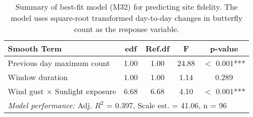 \begin{table}[ht]
\centering
\caption{Summary of best-fit model (M32) for predicting site fidelity. The model uses square-root transformed day-to-day changes in butterfly count as the response variable.}
\label{tab:m32_summary}
\begin{tabular}{lcccc}
\toprule
\textbf{Smooth Term} & \textbf{edf} & \textbf{Ref.df} & \textbf{F} & \textbf{p-value} \\
\midrule
Previous day maximum count & 1.00 & 1.00 & 24.88 & $<$ 0.001*** \\
Window duration & 1.00 & 1.00 & 1.14 & 0.289 \\
Wind gust × Sunlight exposure & 6.68 & 6.68 & 4.10 & $<$ 0.001*** \\
\midrule
\multicolumn{5}{l}{\textit{Model performance:} Adj. $R^2$ = 0.397, Scale est. = 41.06, n = 96} \\
\bottomrule
\end{tabular}
\end{table}